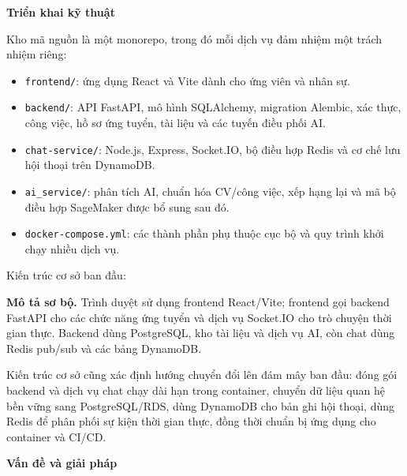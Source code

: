 \vspace{0.5em}\noindent\textbf{Triển khai kỹ
thuật}\par

Kho mã nguồn là một monorepo, trong đó mỗi dịch vụ đảm nhiệm một trách
nhiệm riêng:

\begin{itemize}
\tightlist
\item
  \texttt{frontend/\allowbreak{}}: ứng dụng React và Vite dành cho ứng viên và nhân
  sự.
\item
  \texttt{backend/\allowbreak{}}: API FastAPI, mô hình SQLAlchemy, migration Alembic,
  xác thực, công việc, hồ sơ ứng tuyển, tài liệu và các tuyến điều phối
  AI.
\item
  \texttt{chat-\allowbreak{}service/\allowbreak{}}: Node.js, Express, Socket.IO, bộ điều hợp Redis
  và cơ chế lưu hội thoại trên DynamoDB.
\item
  \texttt{ai\_\allowbreak{}service/\allowbreak{}}: phân tích AI, chuẩn hóa CV/công việc, xếp hạng
  lại và mã bộ điều hợp SageMaker được bổ sung sau đó.
\item
  \texttt{docker-\allowbreak{}compose.\allowbreak{}yml}: các thành phần phụ thuộc cục bộ và quy
  trình khởi chạy nhiều dịch vụ.
\end{itemize}

Kiến trúc cơ sở ban đầu:

\textbf{Mô tả sơ bộ.} Trình duyệt sử dụng frontend React/Vite; frontend
gọi backend FastAPI cho các chức năng ứng tuyển và dịch vụ Socket.IO cho
trò chuyện thời gian thực. Backend dùng PostgreSQL, kho tài liệu và dịch
vụ AI, còn chat dùng Redis pub/sub và các bảng DynamoDB.

Kiến trúc cơ sở cũng xác định hướng chuyển đổi lên đám mây ban đầu: đóng
gói backend và dịch vụ chat chạy dài hạn trong container, chuyển dữ liệu
quan hệ bền vững sang PostgreSQL/RDS, dùng DynamoDB cho bản ghi hội
thoại, dùng Redis để phân phối sự kiện thời gian thực, đồng thời chuẩn
bị ứng dụng cho container và CI/CD.

\vspace{0.5em}\noindent\textbf{Vấn đề và giải
pháp}\par

